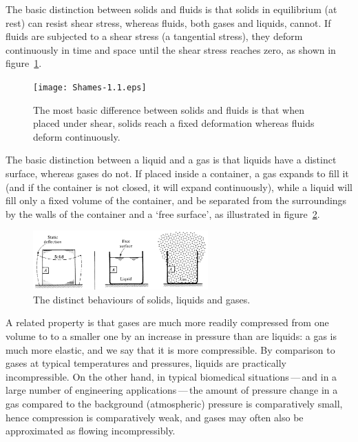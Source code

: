 \documentclass[a4paper,11pt]		{report}
\begin{document}
The basic distinction between solids and fluids is that solids in
equilibrium (\ie at rest) can resist shear stress, whereas fluids,
both gases and liquids, cannot. If fluids are subjected to a shear
stress (\ie a tangential stress), they deform continuously in time and
space until the shear stress reaches zero, as shown in
figure~\ref{fig.def}.

\begin{figure}
\begin{center}
\texttt{[image: Shames-1.1.eps]}
\end{center}
\caption{The most basic difference between solids and fluids is that
  when placed under shear, solids reach a fixed deformation whereas
  fluids deform continuously.
  \citep[From][]{shames62}}
\label{fig.def}
\end{figure}

The basic distinction between a liquid and a gas is that liquids have
a distinct surface, whereas gases do not. If placed inside a
container, a gas expands to fill it (and if the container is not
closed, it will expand continuously), while a liquid will fill only a
fixed volume of the container, and be separated from the surroundings
by the walls of the container and a `free surface', as illustrated in
figure~\ref{fig.slg}.

\begin{figure}
\begin{center}
\includegraphics[width=0.6\textwidth]{White-1.1.eps}
\end{center}
\caption{The distinct behaviours of solids, liquids and
gases. \citep[From][]{white86}}
\label{fig.slg}
\end{figure}

A related property is that gases are much more readily compressed from
one volume to to a smaller one by an increase in pressure than are
liquids: a gas is much more elastic, and we say that it is more
compressible. By comparison to gases at typical temperatures and
pressures, liquids are practically incompressible. On the other hand,
in typical biomedical situations\,---\,and in a large number of
engineering applications\,---\,the amount of pressure change in a gas
compared to the background (atmospheric) pressure is comparatively
small, hence compression is comparatively weak, and gases may often
also be approximated as flowing incompressibly.
\end{document}
